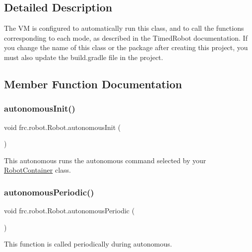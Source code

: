 \subsection{Detailed Description}
The VM is configured to automatically run this class, and to call the functions corresponding to each mode, as described in the Timed\+Robot documentation. If you change the name of this class or the package after creating this project, you must also update the build.\+gradle file in the project. 

\subsection{Member Function Documentation}
\mbox{\label{classfrc_1_1robot_1_1_robot_a5b1c022cd3e2b9f6e5dde62571839173}} 
\subsubsection{\texorpdfstring{autonomousInit()}{autonomousInit()}}
{\footnotesize\ttfamily void frc.\+robot.\+Robot.\+autonomous\+Init (\begin{DoxyParamCaption}{ }\end{DoxyParamCaption})\hspace{0.3cm}{\ttfamily [inline]}}

This autonomous runs the autonomous command selected by your \mbox{\hyperlink{classfrc_1_1robot_1_1_robot_container}{Robot\+Container}} class. \mbox{\label{classfrc_1_1robot_1_1_robot_a7dcfe7d0d65d1051eb095b8eb1aebd72}} 
\subsubsection{\texorpdfstring{autonomousPeriodic()}{autonomousPeriodic()}}
{\footnotesize\ttfamily void frc.\+robot.\+Robot.\+autonomous\+Periodic (\begin{DoxyParamCaption}{ }\end{DoxyParamCaption})\hspace{0.3cm}{\ttfamily [inline]}}

This function is called periodically during autonomous. \mbox{\label{classfrc_1_1robot_1_1_robot_ac19810fbf26efd4cd47cbd7568b4ad2a}} 
